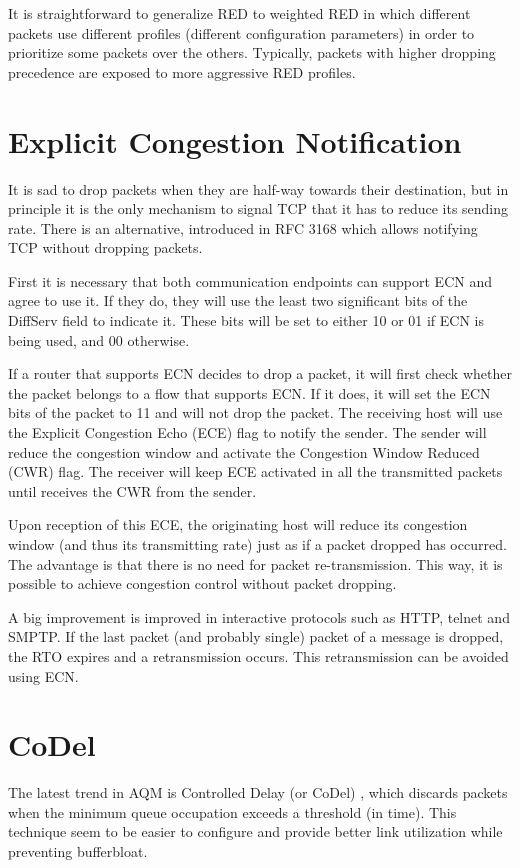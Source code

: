 It is straightforward to generalize RED to weighted RED in which different packets use different profiles (different configuration parameters) in order to prioritize some packets over the others.
Typically, packets with higher dropping precedence are exposed to more aggressive RED profiles.

\section{Explicit Congestion Notification}

It is sad to drop packets when they are half-way towards their destination, but in principle it is the only mechanism to signal TCP that it has to reduce its sending rate.
There is an alternative, introduced in  RFC 3168 \cite{rfc3168} which allows notifying TCP without dropping packets.

First it is necessary that both communication endpoints can support ECN and agree to use it.
If they do, they will use the least two significant bits of the DiffServ field to indicate it.
These bits will be set to either 10 or 01 if ECN is being used, and 00 otherwise.

If a router that supports ECN decides to drop a packet, it will first check whether the packet belongs to a flow that supports ECN.
If it does, it will set the ECN bits of the packet to 11 and will not drop the packet.
The receiving host will use the Explicit Congestion Echo (ECE) flag to notify the sender.
The sender will reduce the congestion window and activate the Congestion Window Reduced (CWR) flag.
The receiver will keep ECE activated in all the transmitted packets until receives the CWR from the sender.

Upon reception of this ECE, the originating host will reduce its congestion window (and thus its transmitting rate) just as if a packet dropped has occurred.
The advantage is that there is no need for packet re-transmission.
This way, it is possible to achieve congestion control without packet dropping.

A big improvement is improved in interactive protocols such as HTTP, telnet and SMPTP.
If the last packet (and probably single) packet of a message is dropped, the RTO expires and a retransmission occurs.
This retransmission can be avoided using ECN.

\section{CoDel}
The latest trend in AQM is Controlled Delay (or CoDel) \cite{nichols2012cqd}, which discards packets when the minimum queue occupation exceeds a threshold (in time).
This technique seem to be easier to configure and provide better link utilization while preventing bufferbloat.
